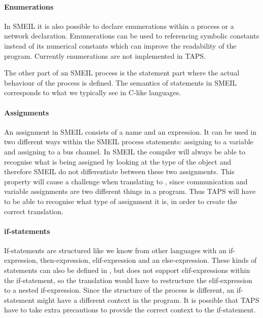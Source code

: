 \paragraph{Enumerations}
In SMEIL it is also possible to declare enumerations within a process or a network declaration. Emumerations can be used to referencing symbolic constants instead of its numerical constants which can improve the readability of the program.
Currently enumerations are not implemented in TAPS.




The other part of an SMEIL process is the statement part where the actual behaviour of the process is defined. The semantics of statements in SMEIL corresponds to what we typically see in C-like languages.
\paragraph{Assignments}
An assignment in SMEIL consists of a name and an expression. It can be used in two different ways within the SMEIL process statements: assigning to a variable and assigning to a bus channel. In SMEIL the compiler will always be able to recognise what is being assigned by looking at the type of the object and therefore SMEIL do not differentiate between these two assignments.
This property will cause a challenge when translating to \cspm{}, since communication and variable assignments are two different things in a \cspm program. Thus TAPS will have to be able to recognise what type of assignment it is, in order to create the correct translation.
\paragraph{if-statements}
If-statements are structured like we know from other languages with an if-expression, then-expression, elif-expression and an else-expression.
These kinds of statements can also be defined in \cspm, but \cspm does not support elif-expressions within the if-statement, so the translation would have to restructure the elif-expression to a nested if-expression.
Since the structure of the \cspm process is different, an if-statement might have a different context in the \cspm program. It is possible that TAPS have to take extra precautions to provide the correct context to the if-statement.

